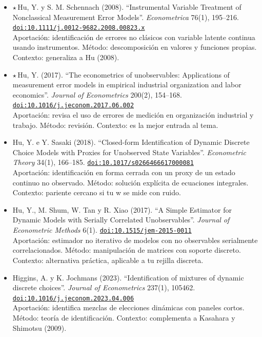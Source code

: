 \documentclass[11pt]{article}
\begin{document}
\begin{itemize}
\item $\star$\,Hu, Y. y S. M. Schennach (2008). ``Instrumental Variable Treatment of Nonclassical Measurement Error Models''. \textit{Econometrica} 76(1), 195--216. \href{https://doi.org/10.1111/j.0012-9682.2008.00823.x}{\texttt{doi:10.1111/j.0012-9682.2008.00823.x}}\\
Aportación: identificación de errores no clásicos con variable latente continua usando instrumentos. Método: descomposición en valores y funciones propias. Contexto: generaliza a Hu (2008).
\item $\star$\,Hu, Y. (2017). ``The econometrics of unobservables: Applications of measurement error models in empirical industrial organization and labor economics''. \textit{Journal of Econometrics} 200(2), 154--168. \href{https://doi.org/10.1016/j.jeconom.2017.06.002}{\texttt{doi:10.1016/j.jeconom.2017.06.002}}\\
Aportación: revisa el uso de errores de medición en organización industrial y trabajo. Método: revisión. Contexto: es la mejor entrada al tema.
\item Hu, Y. e Y. Sasaki (2018). ``Closed-form Identification of Dynamic Discrete Choice Models with Proxies for Unobserved State Variables''. \textit{Econometric Theory} 34(1), 166--185. \href{https://doi.org/10.1017/s0266466617000081}{\texttt{doi:10.1017/s0266466617000081}}\\
Aportación: identificación en forma cerrada con un proxy de un estado continuo no observado. Método: solución explícita de ecuaciones integrales. Contexto: pariente cercano si tu w se mide con ruido.
\item Hu, Y., M. Shum, W. Tan y R. Xiao (2017). ``A Simple Estimator for Dynamic Models with Serially Correlated Unobservables''. \textit{Journal of Econometric Methods} 6(1). \href{https://doi.org/10.1515/jem-2015-0011}{\texttt{doi:10.1515/jem-2015-0011}}\\
Aportación: estimador no iterativo de modelos con no observables serialmente correlacionados. Método: manipulación de matrices con soporte discreto. Contexto: alternativa práctica, aplicable a tu rejilla discreta.
\item Higgins, A. y K. Jochmans (2023). ``Identification of mixtures of dynamic discrete choices''. \textit{Journal of Econometrics} 237(1), 105462. \href{https://doi.org/10.1016/j.jeconom.2023.04.006}{\texttt{doi:10.1016/j.jeconom.2023.04.006}}\\
Aportación: identifica mezclas de elecciones dinámicas con paneles cortos. Método: teoría de identificación. Contexto: complementa a Kasahara y Shimotsu (2009).

\end{itemize}
\end{document}
